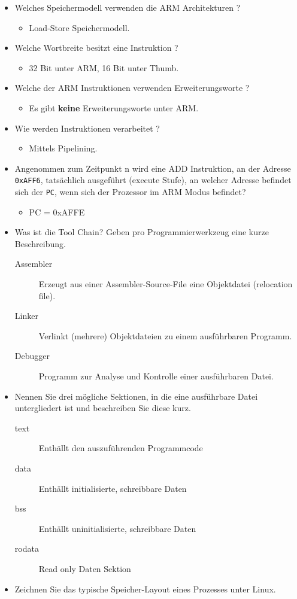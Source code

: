 \documentclass[12pt]{article}
\begin{document}
\begin{itemize}
 \item Welches Speichermodell verwenden die ARM Architekturen ?
     \begin{itemize}
        \item Load-Store Speichermodell.
     \end{itemize}
 \item Welche Wortbreite besitzt eine Instruktion ?
     \begin{itemize}
        \item 32 Bit unter ARM, 16 Bit unter Thumb.
     \end{itemize}
 \item Welche der ARM Instruktionen verwenden Erweiterungsworte ?
     \begin{itemize}
         \item Es gibt \textbf{keine} Erweiterungsworte unter ARM.
     \end{itemize}
 \item Wie werden Instruktionen verarbeitet ?
     \begin{itemize}
         \item Mittels Pipelining.
     \end{itemize}
 \item Angenommen zum Zeitpunkt n wird eine ADD Instruktion, an der Adresse
     \texttt{0xAFF6}, tatsächlich ausgeführt (execute Stufe), an welcher Adresse befindet sich
        der \texttt{PC}, wenn sich der Prozessor im ARM Modus befindet?
     \begin{itemize}
         \item PC = 0xAFFE
     \end{itemize}
 \item Was ist die Tool Chain? Geben pro Programmierwerkzeug eine kurze
     Beschreibung.
     \begin{description}
         \item [Assembler] Erzeugt aus einer Assembler-Source-File eine
             Objektdatei (relocation file).
         \item [Linker] Verlinkt (mehrere) Objektdateien zu einem ausführbaren
             Programm.
        \item [Debugger] Programm zur Analyse und Kontrolle einer ausführbaren
            Datei.
     \end{description}
 \item Nennen Sie drei mögliche Sektionen, in die eine ausführbare Datei
     untergliedert ist und beschreiben Sie diese kurz.
        \begin{description}
            \item [text] Enthällt den auszuführenden Programmcode
            \item [data] Enthällt initialisierte, schreibbare Daten
            \item [bss] Enthällt uninitialisierte, schreibbare Daten
            \item [rodata] Read only Daten Sektion
        \end{description}
 \item Zeichnen Sie das typische Speicher-Layout eines Prozesses unter Linux.
\end{itemize}
\end{document}
